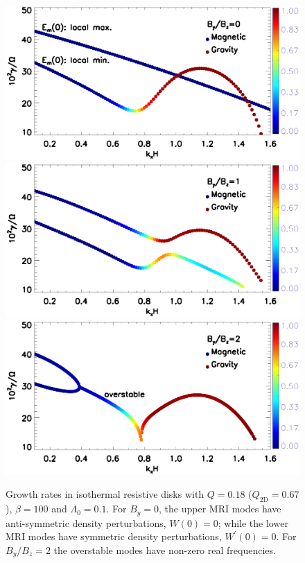 \begin{figure}
  \includegraphics[width=\linewidth,clip=true,trim=0cm 2cm 0cm
    0cm]{figures/compare_growth3_tilted_resis_ep0.ps}  
  \includegraphics[width=\linewidth,clip=true,trim=0cm 2cm 0cm
    0.52cm]{figures/compare_growth3_tilted_resis_ep1.ps}
  \includegraphics[width=\linewidth,clip=true,trim=0cm 0cm 0cm
    0.52cm]{figures/compare_growth3_tilted_resis_ep2.ps}
  \caption{Growth rates in isothermal resistive disks with $Q=0.18$
    ($Q_\mathrm{2D}=0.67$), $\beta=100$ and $\Lambda_0=0.1$. For
    $B_y=0$, the upper MRI modes have anti-symmetric density
    perturbations, $W(0) = 0$; while the lower MRI modes have symmetric
    density perturbations, $W^\prime(0) = 0$. For $B_y/B_z=2$ the
    overstable modes have non-zero real frequencies. 
    \label{compare_growth3_tilted_resis}}
\end{figure}

